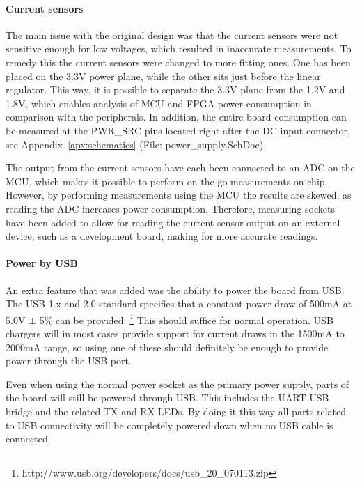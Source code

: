 \paragraph{Current sensors} \label{psu:current_sensors}

The main issue with the original design was that the current sensors were not
sensitive enough for low voltages, which resulted in inaccurate measurements. To
remedy this the current sensors were changed to more fitting ones. One has been
placed on the 3.3V power plane, while the other sits just before the linear
regulator. This way, it is possible to separate the 3.3V plane from the 1.2V and
1.8V, which enables analysis of MCU and FPGA power consumption in comparison
with the peripherals. In addition, the entire board consumption can be measured
at the PWR\_SRC pins located right after the DC input connector, see
Appendix~\ref{apx:schematics} (File: power\_supply.SchDoc).

The output from the current sensors have each been connected to an ADC on the
MCU, which makes it possible to perform on-the-go measurements on-chip. However,
by performing measurements using the MCU the results are skewed, as reading the
ADC increases power consumption. Therefore, measuring sockets have been added to
allow for reading the current sensor output on an external device, such as a
development board, making for more accurate readings.

\paragraph{Power by USB} \label{psu:usb}

An extra feature that was added was the ability to power the board from USB. The
USB 1.x and 2.0 standard specifies that a constant power draw of 500mA at 5.0V
$\pm$ 5\% can be provided. \footnote{
http://www.usb.org/developers/docs/usb\_20\_070113.zip}  This should suffice for normal operation. USB chargers will in
most cases provide support for current draws in the 1500mA to 2000mA range, so
using one of these should definitely be enough to provide power through the USB
port.

Even when using the normal power socket as the primary power supply, parts of
the board will still be powered through USB. This includes the UART-USB bridge
and the related TX and RX LEDs. By doing it this way all parts related to USB
connectivity will be completely powered down when no USB cable is connected.
